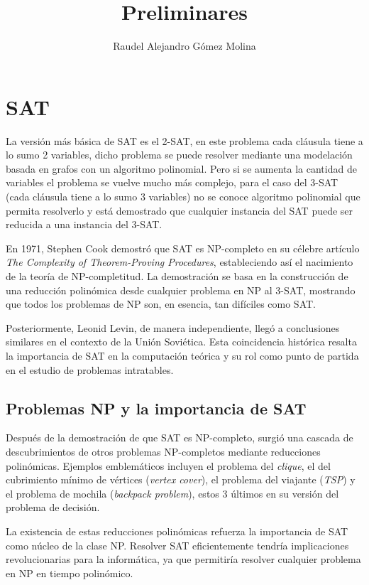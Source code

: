 \documentclass{article}
\title{Preliminares}
\author{Raudel Alejandro Gómez Molina}
\begin{document}
\maketitle

\section{SAT}

La versión más básica de SAT es el 2-SAT, en este problema cada cláusula tiene a lo sumo 2 variables, dicho problema se puede
resolver mediante una modelación basada en grafos con un algoritmo polinomial. Pero si se aumenta la cantidad de variables
el problema se vuelve mucho más complejo, para el caso del 3-SAT (cada cláusula tiene a lo sumo 3 variables) no se conoce algoritmo
polinomial que permita resolverlo y está demostrado que cualquier instancia del SAT puede ser reducida a una instancia del 3-SAT.

En 1971, Stephen Cook demostró que SAT es NP-completo en su célebre artículo \textit{The Complexity of Theorem-Proving Procedures},
estableciendo así el nacimiento de la teoría de NP-completitud. La demostración se basa en la construcción de una
reducción polinómica desde cualquier problema en NP al 3-SAT, mostrando que todos los problemas de NP son, en esencia,
tan difíciles como SAT.

Posteriormente, Leonid Levin, de manera independiente, llegó a conclusiones similares en el contexto de la
Unión Soviética. Esta coincidencia histórica resalta la importancia de SAT en la computación teórica y su rol como
punto de partida en el estudio de problemas intratables.

\subsection{Problemas NP y la importancia de SAT}

Después de la demostración de que SAT es NP-completo, surgió una cascada de descubrimientos de otros problemas
NP-completos mediante reducciones polinómicas. Ejemplos emblemáticos incluyen el problema del \textit{clique},
el del cubrimiento mínimo de vértices (\textit{vertex cover}), el problema del viajante (\textit{TSP}) y el problema de mochila (\textit{backpack problem}),
estos 3 últimos en su versión del problema de decisión.

La existencia de estas reducciones polinómicas refuerza la importancia de SAT como núcleo de la clase NP.
Resolver SAT eficientemente tendría implicaciones revolucionarias para la informática, ya que permitiría resolver
cualquier problema en NP en tiempo polinómico.
\end{document}
